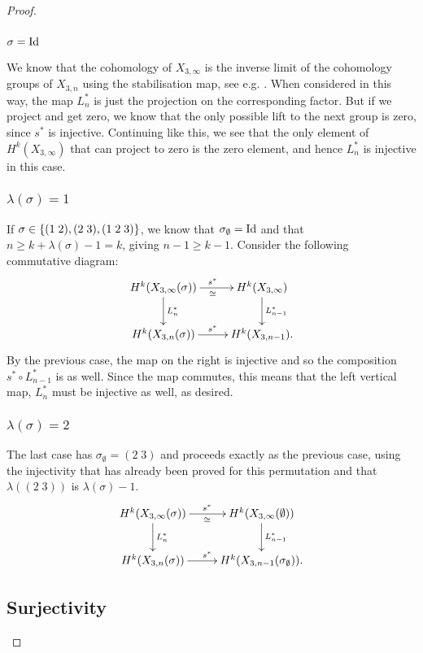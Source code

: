 \begin{proof}
\subsubsection{$\sigma = \operatorname{Id}$}

We know that the cohomology of $X_{3,\infty}$ is the inverse
limit of the cohomology groups of $X_{3,n}$ using the stabilisation
map, see e.g. \cite{may}. 
When considered in this way, the map $L_n^*$ is just the projection on
the corresponding factor. But if we project and get zero, we know that
the only possible lift to the next group is zero, since $s^*$ is
injective. Continuing like this, we see that the only element of
$H^k(X_{3,\infty})$ that can project to zero is the zero element, and
hence $L_n^*$ is injective in this case.

\subsubsection{$\lambda(\sigma) = 1$}

If $\sigma \in \left\{ (1\;2),(2\;3),(1\;2\;3) \right\}$, we know that
$\sigma_{\emptyset} = \operatorname{Id}$ and that $n \geq k + \lambda(\sigma) - 1 =
k$, giving $n-1\geq k-1$. Consider the following commutative diagram:
\[ \xymatrix{ H^k(X_{3,\infty}(\sigma)) \ar[r]^{s^*}_{\cong}
  \ar[d]^{L_n^*} & 
  H^k(X_{3,\infty}) \ar[d]^{L_{n-1}^*} \\
  H^k(X_{3,n}(\sigma)) \ar[r]^{s^*} & H^k(X_{3,n-1}).
} \]
By the previous case, the map on the right is injective and so the
composition $s^* \circ L_{n-1}^*$ is as well. Since the map commutes,
this means that the left vertical map, $L_n^*$ must be injective as
well, as desired.

\subsubsection{$\lambda(\sigma) = 2$}

The last case has $\sigma_{\emptyset} = (2\;3)$ and proceeds exactly
as the previous case, using the injectivity that has already been
proved for this permutation and that $\lambda((2\;3))$ is
$\lambda(\sigma)-1$.
\[ \xymatrix{ H^k(X_{3,\infty}(\sigma)) \ar[r]^{s^*}_{\cong}
  \ar[d]^{L_n^*} &
  H^k(X_{3,\infty}(\emptyset)) \ar[d]^{L_{n-1}^*} \\
  H^k(X_{3,n}(\sigma)) \ar[r]^{s^*} & H^k(X_{3,n-1}(\sigma_{\emptyset})).
} \]

\subsection{Surjectivity}


\end{proof}

